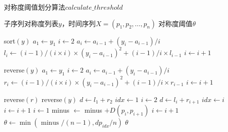 \renewcommand{\algorithmicrequire}{\textbf{输入：}\unskip}
\renewcommand{\algorithmicensure}{\textbf{输出：}\unskip}

\begin{algorithm}[t]
  \caption{对称度阈值划分算法$calculate\_threshold$}
  \label{alg:threshold}
  \small
  \begin{algorithmic}
    \REQUIRE 子序列对称度列表$y$，时间序列$X=\left(p_{1}, p_{2}, \dots, p_{n}\right)$
    \ENSURE 对称度阈值$\theta$

    \STATE sort$(y)$
    \STATE $a_1 \leftarrow y_1$
    \STATE $i \leftarrow 2$
    \STATE $a_i \leftarrow a_{i-1}+(y_i-a_{i-1})/{i}$
    \STATE $l_i \leftarrow (i-1) / (i \times i) \times(y_i-a_{i-1})^{2}+(i-1) / i \times l_{i-1}$
    \STATE $i \leftarrow i+1$
    \ENDWHILE

    \STATE reverse$(y)$
    \STATE $a_1 \leftarrow y_1$
    \STATE $i \leftarrow 2$
    \STATE $a_i \leftarrow a_{i-1}+(y_i-a_{i-1})/{i}$
    \STATE $r_i \leftarrow (i-1) / (i \times i) \times(y_i-a_{i-1})^{2}+(i-1) / i \times r_{i-1}$
    \STATE $i \leftarrow i+1$
    \ENDWHILE

    \STATE reverse$(r)$
    \STATE reverse$(y)$
    \STATE $d \leftarrow l_1 + r_2$
    \STATE $idx \leftarrow 1$
    \STATE $i \leftarrow 2$
    \STATE $d \leftarrow l_i + r_{i+1}$
    \STATE $idx \leftarrow i$
    \ENDIF
    \STATE $i \leftarrow i+1$
    \ENDWHILE
    \STATE $i \leftarrow 1$
    \STATE minus $\leftarrow$ minus $+D\left(p_{i}, p_{i+1}\right)$
    \STATE $i \leftarrow i+1$
    \ENDWHILE
    \STATE $\theta \leftarrow \min \left({\text { minus }} / (n-1), {dp_{idx}} / {n}\right)$
    \RETURN $\theta$
  \end{algorithmic}
\end{algorithm}

